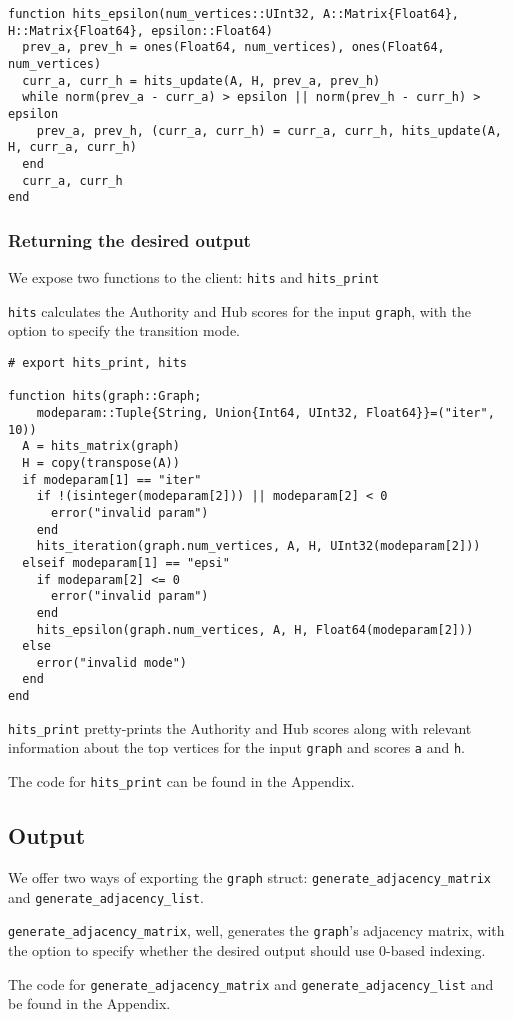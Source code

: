 \documentclass[12pt, titlepage, twoside]{amsart}
\begin{document}
\begin{verbatim}
function hits_epsilon(num_vertices::UInt32, A::Matrix{Float64}, H::Matrix{Float64}, epsilon::Float64)
  prev_a, prev_h = ones(Float64, num_vertices), ones(Float64, num_vertices)
  curr_a, curr_h = hits_update(A, H, prev_a, prev_h)
  while norm(prev_a - curr_a) > epsilon || norm(prev_h - curr_h) > epsilon
    prev_a, prev_h, (curr_a, curr_h) = curr_a, curr_h, hits_update(A, H, curr_a, curr_h)
  end
  curr_a, curr_h
end
\end{verbatim}

\subsubsection{Returning the desired output}

We expose two functions to the client: \texttt{hits} and \texttt{hits_print}

\texttt{hits} calculates the Authority and Hub scores for the input \texttt{graph},
with the option to specify the transition mode.

\begin{verbatim}
# export hits_print, hits

function hits(graph::Graph;
    modeparam::Tuple{String, Union{Int64, UInt32, Float64}}=("iter", 10))
  A = hits_matrix(graph)
  H = copy(transpose(A))
  if modeparam[1] == "iter"
    if !(isinteger(modeparam[2])) || modeparam[2] < 0
      error("invalid param")
    end
    hits_iteration(graph.num_vertices, A, H, UInt32(modeparam[2]))
  elseif modeparam[1] == "epsi"
    if modeparam[2] <= 0
      error("invalid param")
    end
    hits_epsilon(graph.num_vertices, A, H, Float64(modeparam[2]))
  else
    error("invalid mode")
  end
end
\end{verbatim}

\texttt{hits_print} pretty-prints the Authority and Hub scores along with relevant information
about the top vertices for the input \texttt{graph} and scores \texttt{a} and \texttt{h}.

The code for \texttt{hits_print} can be found in the Appendix.

\subsection{Output}

We offer two ways of exporting the \texttt{graph} struct: \texttt{generate_adjacency_matrix}
and \texttt{generate_adjacency_list}.

\texttt{generate_adjacency_matrix}, well, generates the \texttt{graph}'s adjacency matrix,
with the option to specify whether the desired output should use 0-based indexing.

The code for \texttt{generate_adjacency_matrix} and \texttt{generate_adjacency_list} and be
found in the Appendix.
\end{document}
